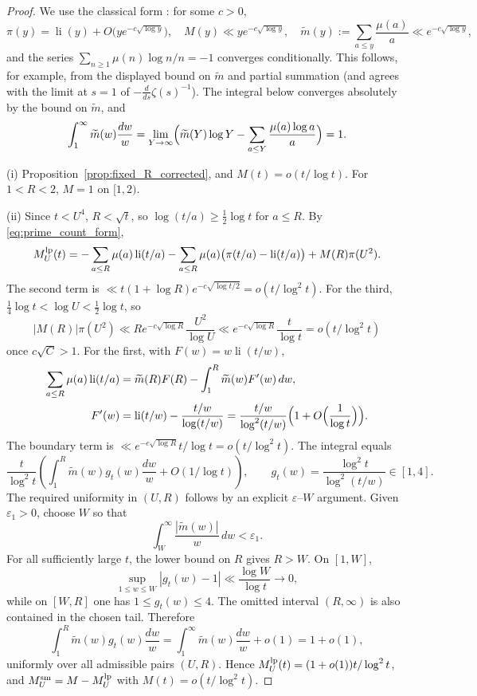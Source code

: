 \documentclass[11pt]{amsart}
\numberwithin{equation}{section}
\theoremstyle{plain}
\theoremstyle{definition}
\theoremstyle{remark}
\DeclareMathOperator{\li}{li}
\newcommand{\mt}{\widetilde{m}}
\begin{document}
\begin{proof}
We use the classical form \cite{MontgomeryVaughan2007}: for some $c>0$,
\begin{equation}
\label{eq:pnt_inputs}
  \pi(y)=\li(y)+O\bigl(ye^{-c\sqrt{\log y}}\bigr),\quad
  M(y)\ll ye^{-c\sqrt{\log y}},\quad
  \mt(y):=\sum_{a\le y}\frac{\mu(a)}a\ll e^{-c\sqrt{\log y}},
\end{equation}
and the series
$\sum_{n\ge1}\mu(n)\log n/n=-1$ converges conditionally.  This follows,
for example, from the displayed bound on $\mt$ and partial summation (and
agrees with the limit at $s=1$ of
$-\frac{d}{ds}\zeta(s)^{-1}$).  The integral below converges absolutely by
the bound on $\mt$, and
\begin{equation}
\label{eq:mtilde_integral}
  \int_1^\infty\mt(w)\frac{dw}w
  =\lim_{Y\to\infty}\Bigl(\mt(Y)\log Y-\sum_{a\le Y}\frac{\mu(a)\log a}a\Bigr)=1.
\end{equation}

(i) Proposition~\ref{prop:fixed_R_corrected}, and $M(t)=o(t/\log t)$. For
$1<R<2$, $M=1$ on $[1,2)$.

(ii) Since $t<U^4$, $R<\sqrt t$, so $\log(t/a)\ge\frac12\log t$ for $a\le R$.
By \eqref{eq:prime_count_form},
\begin{equation}
\label{eq:E_three_terms}
  M^{\rm lp}_U(t)=-\sum_{a\le R}\mu(a)\li(t/a)
  -\sum_{a\le R}\mu(a)\bigl(\pi(t/a)-\li(t/a)\bigr)+M(R)\pi(U^2).
\end{equation}
The second term is $\ll t(1+\log R)e^{-c\sqrt{\log t/2}}=o(t/\log^2t)$. For
the third, $\tfrac14\log t<\log U<\tfrac12\log t$, so
\[
|M(R)|\pi(U^2)\ll Re^{-c\sqrt{\log R}}\frac{U^2}{\log U}
\ll e^{-c\sqrt{\log R}}\frac{t}{\log t}=o(t/\log^2t)
\]
once $c\sqrt C>1$. For the first, with $F(w)=w\li(t/w)$,
\begin{align}
\label{eq:partial_summation_li}
  \sum_{a\le R}\mu(a)\li(t/a)
  &=\mt(R)F(R)-\int_1^R\mt(w)F'(w)\,dw,\\
  F'(w)&=\li(t/w)-\frac{t/w}{\log(t/w)}
  =\frac{t/w}{\log^2(t/w)}\Bigl(1+O\Bigl(\frac1{\log t}\Bigr)\Bigr).\notag
\end{align}
The boundary term is $\ll e^{-c\sqrt{\log R}}t/\log t=o(t/\log^2t)$. The
integral equals
\[
\frac t{\log^2t}\left(\int_1^R\mt(w)g_t(w)\frac{dw}w+O(1/\log t)\right),
\qquad
g_t(w)=\frac{\log^2t}{\log^2(t/w)}\in[1,4].
\]
The required uniformity in $(U,R)$ follows by an explicit
$\varepsilon$--$W$ argument.  Given $\varepsilon_1>0$, choose $W$ so that
\[
 \int_W^\infty\frac{|\mt(w)|}{w}\,dw<\varepsilon_1.
\]
For all sufficiently large $t$, the lower bound on $R$ gives $R>W$.  On
$[1,W]$,
\[
 \sup_{1\le w\le W}|g_t(w)-1|\ll\frac{\log W}{\log t}\to0,
\]
while on $[W,R]$ one has $1\le g_t(w)\le4$.  The omitted interval
$(R,\infty)$ is also contained in the chosen tail.  Therefore
\[
 \int_1^R\mt(w)g_t(w)\frac{dw}{w}
 =\int_1^\infty\mt(w)\frac{dw}{w}+o(1)=1+o(1),
\]
uniformly over all admissible pairs $(U,R)$. Hence
$M^{\rm lp}_U(t)=(1+o(1))t/\log^2t$, and $M^{\rm sm}_U=M-M^{\rm lp}_U$ with $M(t)=o(t/\log^2t)$.
\end{proof}
\end{document}
